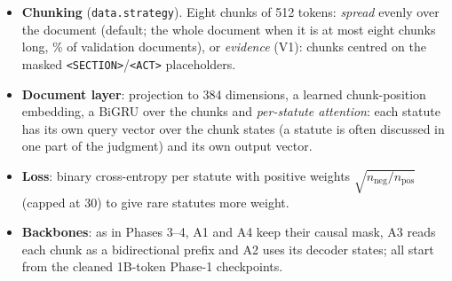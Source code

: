 \documentclass[11pt,a4paper]{article}
\newcommand{\code}[1]{\texttt{\small #1}}
\begin{document}
\begin{itemize}
  \item \textbf{Chunking} (\code{data.strategy}).  Eight chunks of 512 tokens: \emph{spread} evenly over the
  document (default; the whole document when it is at most eight chunks long, \shortereight\% of validation
  documents), or \emph{evidence} (V1): chunks centred on the masked \code{<SECTION>}/\code{<ACT>} placeholders.
  \item \textbf{Document layer}: projection to 384 dimensions, a learned chunk-position embedding, a BiGRU over
  the chunks and \emph{per-statute attention}: each statute has its own query vector over the chunk states
  (a statute is often discussed in one part of the judgment) and its own output vector.
  \item \textbf{Loss}: binary cross-entropy per statute with positive weights $\sqrt{n_\text{neg}/n_\text{pos}}$
  (capped at 30) to give rare statutes more weight.
  \item \textbf{Backbones}: as in Phases 3--4, A1 and A4 keep their causal mask, A3 reads each chunk as a
  bidirectional prefix and A2 uses its decoder states; all start from the cleaned 1B-token Phase-1 checkpoints.
\end{itemize}
\end{document}
